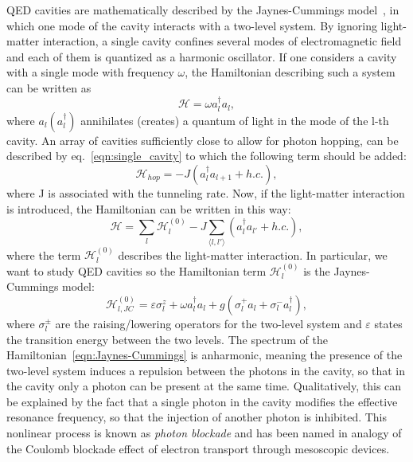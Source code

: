 QED cavities are mathematically described by the Jaynes-Cummings model~\cite{shore_knight}, in which one mode of the cavity interacts with a two-level system. By ignoring light-matter interaction, a single cavity confines several modes of electromagnetic field and each of them is quantized as a harmonic oscillator. If one considers a cavity with a single mode with frequency $\omega$, the Hamiltonian describing such a system can be written as
\begin{equation}
\label{eqn:single_cavity}
    \mathcal{H} = \omega a^{\dagger}_la_l,
\end{equation}
where $a_l (a_l^{\dagger})$ annihilates (creates) a quantum of light in the mode of the l-th cavity.
An array of cavities sufficiently close to allow for photon hopping, can be described by eq.~\ref{eqn:single_cavity} to which the following term should be added:
\begin{equation*}
    \mathcal{H}_{hop} = -J (a^{\dagger}_la_{l+1} + h.c.),
\end{equation*}
where J is associated with the tunneling rate.
Now, if the light-matter interaction is introduced, the Hamiltonian can be written in this way:
\begin{equation}
    \mathcal{H} = \sum_l \mathcal{H}_l^{(0)} - J \sum_{\langle l, l' \rangle}(a^{\dagger}_la_{l'} + h.c.),
\end{equation}
where the term $\mathcal{H}_l^{(0)}$ describes the light-matter interaction. In particular, we want to study QED cavities so the Hamiltonian term $\mathcal{H}_l^{(0)}$ is the Jaynes-Cummings model:
\begin{equation}
\label{eqn:Jaynes-Cummings}
    \mathcal{H}_{l,JC}^{(0)} = \varepsilon \sigma^z_l + \omega a^{\dagger}_la_l + g(\sigma^+_l a_l + \sigma^-_l a_l^{\dagger}),
\end{equation}
where $\sigma^\pm_l$ are the raising/lowering operators for the two-level system and $\varepsilon$ states the transition energy between the two levels.
The spectrum of the Hamiltonian~\ref{eqn:Jaynes-Cummings} is anharmonic, meaning the presence of the two-level system induces a repulsion between the photons in the cavity, so that in the cavity only a photon can be present at the same time. Qualitatively, this can be explained by the fact that a single photon in the cavity modifies the effective resonance frequency, so that the injection of another photon is inhibited. This nonlinear process is known as \emph{photon blockade} and has been named in analogy of the Coulomb blockade effect of electron transport through mesoscopic devices.

